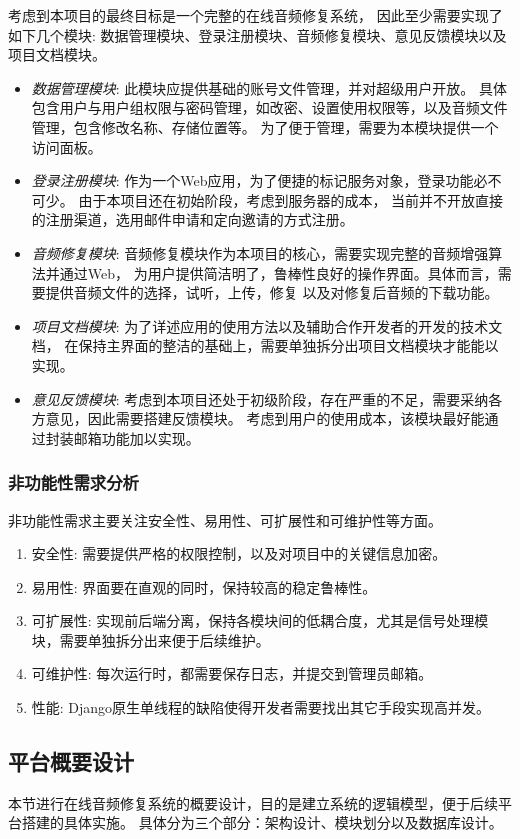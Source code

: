 \documentclass{morningstar}
\begin{document}
考虑到本项目的最终目标是一个完整的在线音频修复系统，
因此至少需要实现了如下几个模块: 
数据管理模块、登录注册模块、音频修复模块、意见反馈模块以及
项目文档模块。

\begin{itemize}
    \item \emph{数据管理模块}: 此模块应提供基础的账号文件管理，并对超级用户开放。
    具体包含用户与用户组权限与密码管理，如改密、设置使用权限等，以及音频文件管理，包含修改名称、存储位置等。
    为了便于管理，需要为本模块提供一个访问面板。
    \item \emph{登录注册模块}: 作为一个Web应用，为了便捷的标记服务对象，登录功能必不可少。
    由于本项目还在初始阶段，考虑到服务器的成本，
    当前并不开放直接的注册渠道，选用邮件申请和定向邀请的方式注册。
    \item \emph{音频修复模块}: 音频修复模块作为本项目的核心，需要实现完整的音频增强算法并通过Web，
    为用户提供简洁明了，鲁棒性良好的操作界面。具体而言，需要提供音频文件的选择，试听，上传，修复
    以及对修复后音频的下载功能。
    \item \emph{项目文档模块}: 为了详述应用的使用方法以及辅助合作开发者的开发的技术文档，
    在保持主界面的整洁的基础上，需要单独拆分出项目文档模块才能能以实现。
    \item \emph{意见反馈模块}: 考虑到本项目还处于初级阶段，存在严重的不足，需要采纳各方意见，因此需要搭建反馈模块。
    考虑到用户的使用成本，该模块最好能通过封装邮箱功能加以实现。
\end{itemize}


\subsubsection{非功能性需求分析}
非功能性需求主要关注安全性、易用性、可扩展性和可维护性等方面。 
\begin{enumerate}
\item 安全性: 需要提供严格的权限控制，以及对项目中的关键信息加密。
\item 易用性: 界面要在直观的同时，保持较高的稳定鲁棒性。
\item 可扩展性: 实现前后端分离，保持各模块间的低耦合度，尤其是信号处理模块，需要单独拆分出来便于后续维护。
\item 可维护性: 每次运行时，都需要保存日志，并提交到管理员邮箱。
\item 性能: Django原生单线程的缺陷使得开发者需要找出其它手段实现高并发。
\end{enumerate}    


\clearpage
\subsection{平台概要设计}
本节进行在线音频修复系统的概要设计，目的是建立系统的逻辑模型，便于后续平台搭建的具体实施。
具体分为三个部分：架构设计、模块划分以及数据库设计。
\end{document}
